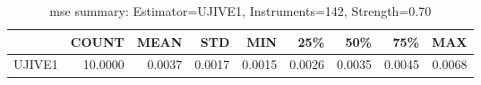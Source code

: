 \begin{table}[ht]
\centering
\caption{mse summary: Estimator=UJIVE1, Instruments=142, Strength=0.70}
\begin{tabular}{lrrrrrrrr}
\toprule
 & COUNT & MEAN & STD & MIN & 25\% & 50\% & 75\% & MAX \\
\midrule
UJIVE1 & 10.0000 & 0.0037 & 0.0017 & 0.0015 & 0.0026 & 0.0035 & 0.0045 & 0.0068 \\
\bottomrule
\end{tabular}
\end{table}
